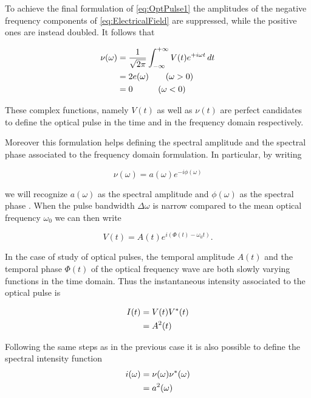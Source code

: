 To achieve the final formulation of \autoref{eq:OptPulse1} the amplitudes of the negative frequency components of \autoref{eq:ElectricalField} are suppressed, while the positive ones are instead doubled.
It follows that 

\begin{align}
\nu(\omega) &= \frac{1}{\sqrt{2\pi}}\int_{-\infty}^{+\infty} V(t)e^{+i\omega t}\, dt \notag \\
            &= 2e(\omega) \quad \quad (\omega > 0) \notag \\
            &= 0  \quad \quad \quad (\omega < 0)
\label{eq:OptPulseFreq}
\end{align}

These complex functions, namely $V(t)$ as well as $\nu (t)$ are perfect candidates to define the optical pulse in the time and in the frequency domain respectively.

Moreover this formulation helps defining the spectral amplitude and the spectral phase associated to the frequency domain formulation.
In particular, by writing

\begin{equation}
\nu (\omega) = a(\omega) e^{-i\phi (\omega)}
\label{eq:SpecFeatures}
\end{equation}

we will recognize $a(\omega)$ as the spectral amplitude and $\phi (\omega)$ as the spectral phase \cite{Bradley1974}.
When the pulse bandwidth $\Delta \omega$ is narrow compared to the mean optical frequency $\omega _0$ we can then write 

\begin{equation}
    V(t)=A(t)e^{i(\Phi (t)-\omega _{0} t )}.
\label{eq:OptSynthetic}
\end{equation}

In the case of study of optical pulses, the temporal amplitude $A(t)$ and the temporal phase $\Phi (t)$ of the optical frequency wave are both slowly varying functions in the time domain. Thus the instantaneous intensity associated to the optical pulse is 

\begin{align}
    I(t) &= V(t)V^{*}(t) \notag \\
         &= A^{2}(t)
\label{eq:OptIntensity}
\end{align}

Following the same steps as in the previous case it is also possible to define the spectral intensity function
\begin{align}
    i(\omega) &= \nu (\omega)\nu ^{*}(\omega) \notag \\
              &= a^2 (\omega)
\label{eq:OptFreqIntensity}
\end{align}

